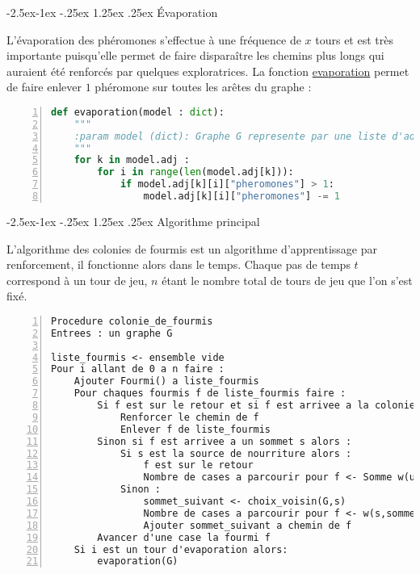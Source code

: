 \documentclass[
12pt,
french,
]{article}
\makeatletter
\renewcommand\paragraph{\@startsection{paragraph}{4}{\z@}%
        {-2.5ex\@plus -1ex \@minus -.25ex}%
        {1.25ex \@plus .25ex}%
        {\normalfont\normalsize\bfseries}}
\makeatother
\begin{document}
\hypertarget{uxe9vaporation}{%
\paragraph{Évaporation}\label{uxe9vaporation}}

L'évaporation des phéromones s'effectue à une fréquence de \(x\) tours
et est très importante puisqu'elle permet de faire disparaître les
chemins plus longs qui auraient été renforcés par quelques
exploratrices. La fonction \protect\hyperlink{evaporation}{evaporation}
permet de faire enlever \(1\) phéromone sur toutes les arêtes du graphe
:

\begin{lstlisting}[language=Python, numbers=left, caption={Frequence d evaporation}]
def evaporation(model : dict):
    """
    :param model (dict): Graphe G represente par une liste d'adjacence
    """
    for k in model.adj :
        for i in range(len(model.adj[k])):
            if model.adj[k][i]["pheromones"] > 1:
                model.adj[k][i]["pheromones"] -= 1
\end{lstlisting}

\hypertarget{algorithme-principal}{%
\paragraph{Algorithme principal}\label{algorithme-principal}}

L'algorithme des colonies de fourmis est un algorithme d'apprentissage
par renforcement, il fonctionne alors dans le temps. Chaque pas de temps
\(t\) correspond à un tour de jeu, \(n\) étant le nombre total de tours
de jeu que l'on s'est fixé.

\begin{lstlisting}[numbers=left, caption={Algorithme Colonies de fourmis}]
Procedure colonie_de_fourmis
Entrees : un graphe G

liste_fourmis <- ensemble vide
Pour i allant de 0 a n faire :
    Ajouter Fourmi() a liste_fourmis
    Pour chaques fourmis f de liste_fourmis faire :
        Si f est sur le retour et si f est arrivee a la colonie alors :
            Renforcer le chemin de f
            Enlever f de liste_fourmis
        Sinon si f est arrivee a un sommet s alors :
            Si s est la source de nourriture alors :
                f est sur le retour
                Nombre de cases a parcourir pour f <- Somme w(u,v) avec (u,v) l'ensemble des aretes du chemin de f
            Sinon :
                sommet_suivant <- choix_voisin(G,s)
                Nombre de cases a parcourir pour f <- w(s,sommet_suivant)
                Ajouter sommet_suivant a chemin de f
        Avancer d'une case la fourmi f
    Si i est un tour d'evaporation alors:
        evaporation(G)
\end{lstlisting}
\end{document}

